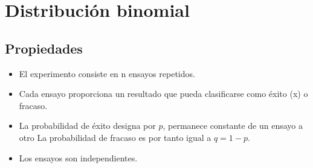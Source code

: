 \section{Distribución binomial}
\subsection{Propiedades}
\begin{itemize}
    \item El experimento consiste en n ensayos repetidos.
    \item Cada ensayo proporciona un resultado que pueda clasificarse como éxito (x) o fracaso.
    \item La probabilidad de éxito designa por $p$, permanece constante de un ensayo a otro La probabilidad de fracaso es por tanto igual a $q=1-p$.
    \item Los ensayos son independientes.
\end{itemize}
